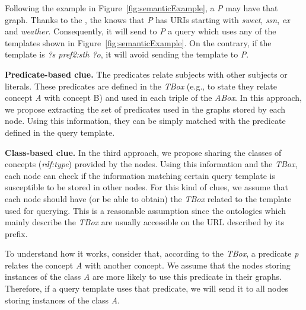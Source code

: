 Following the example in Figure~\ref{fig:semanticExample}, a \provider{} \emph{P} may have that graph.
Thanks to the \clues{}, the \consumer{} knows that \emph{P} has URIs starting with \emph{sweet}, \emph{ssn}, \emph{ex} and \emph{weather}.
Consequently, it will send to \emph{P} a query which uses any of the templates shown in Figure~\ref{fig:semanticExample}.
On the contrary, if the template is \emph{?s pref2:sth ?o}, it will avoid sending the template to \emph{P}.


\medskip

\noindent\textbf{Predicate-based clue.}
The predicates relate subjects with other subjects or literals.
These predicates are defined in the \emph{TBox} (e.g., to state they relate concept \emph{A} with concept B) and used in each triple of the \emph{ABox}.
In this approach, we propose extracting the set of predicates used in the graphs stored by each node.
Using this information, they can be simply matched with the predicate defined in the query template.

\medskip

\noindent\textbf{Class-based clue.}
In the third approach, we propose sharing the classes of concepts (\textit{rdf:type}) provided by the nodes.
Using this information and the \emph{TBox}, each node can check if the information matching certain query template is susceptible to be stored in other nodes.
For this kind of clues, we assume that each node should have (or be able to obtain) the \emph{TBox} related to the template used for querying.
This is a reasonable assumption since the ontologies which mainly describe the \emph{TBox} are usually accessible on the URL described by its prefix.

To understand how it works, consider that, according to the \emph{TBox}, a predicate \emph{p} relates the concept \emph{A} with another concept.
We assume that the nodes storing instances of the class \emph{A} are more likely to use this predicate in their graphs.
Therefore, if a query template uses that predicate, we will send it to all nodes storing instances of the class \emph{A}.




